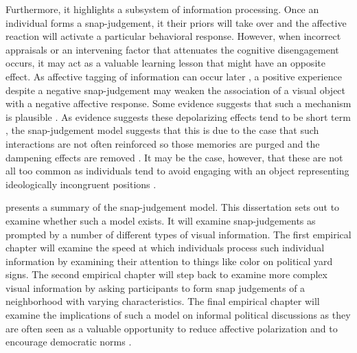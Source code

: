 \documentclass [12pt]{article}
\begin{document}
Furthermore, it highlights a subsystem of information processing. Once an individual forms a snap-judgement, it their priors will take over and the affective reaction will activate a particular behavioral response. However, when incorrect appraisals or an intervening factor that attenuates the cognitive disengagement occurs, it may act as a valuable learning lesson that might have an opposite effect. As affective tagging of information can occur later \citep{kensinger_fields_2022_ohhum}, a positive experience despite a negative snap-judgement may weaken the association of a visual object with a negative affective response. Some evidence suggests that such a mechanism is plausible \citep{santoro_broockman_2022_sa}. As evidence suggests these depolarizing effects tend to be short term \citep{santoro_broockman_2022_sa}, the snap-judgement model suggests that this is due to the case that such interactions are not often reinforced so those memories are purged and the dampening effects are removed \citep[see][]{kahana_et-al_2022_ohhum}. It may be the case, however, that these are not all too common as individuals tend to avoid engaging with an object representing ideologically incongruent positions \citep[see][]{mutz_2006, klar_krupnikov_2016}.

 presents a summary of the snap-judgement model. This dissertation sets out to examine whether such a model exists. It will examine snap-judgements as prompted by a number of different types of visual information. The first empirical chapter will examine the speed at which individuals process such individual information by examining their attention to things like color on political yard signs. The second empirical chapter will step back to examine more complex visual information by asking participants to form snap judgements of a neighborhood with varying characteristics. The final empirical chapter will examine the implications of such a model on informal political discussions as they are often seen as a valuable opportunity to reduce affective polarization and to encourage democratic norms \citep{levendusky_stecula_2021, santoro_broockman_2022_sa}. 
\end{document}
